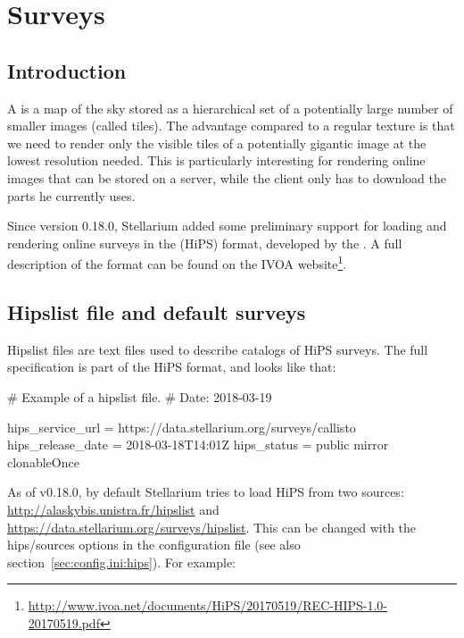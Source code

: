 
\chapter{Surveys}
\label{ch:surveys}

\section{Introduction}
\label{sec:surveys:introduction}


A   is a map of the sky stored as a hierarchical set of a potentially
large number of smaller images (called tiles).  The advantage compared to a
regular texture is that we need to render only the visible tiles of a potentially gigantic image at the
lowest resolution needed.  This is particularly interesting for rendering
online images that can be stored on a server, while the client only has
to download the parts he currently uses.

Since version 0.18.0, Stellarium added some preliminary support for loading and
rendering online surveys in the  (HiPS) format,
developed by the .
A full description of the format can be found on the IVOA website\footnote{%
\url{http://www.ivoa.net/documents/HiPS/20170519/REC-HIPS-1.0-20170519.pdf}}.

\section{Hipslist file and default surveys}
\label{sec:surveys:hipslistFile}

Hipslist files are text files used to describe catalogs of HiPS surveys.  The
full specification is part of the HiPS format, and looks like that:

\begin{configfileScr}
# Example of a hipslist file.
# Date: 2018-03-19

hips_service_url  = https://data.stellarium.org/surveys/callisto
hips_release_date = 2018-03-18T14:01Z
hips_status       = public mirror clonableOnce
\end{configfileScr}

As of v0.18.0, by default Stellarium tries to load HiPS from two sources:
\url{http://alaskybis.unistra.fr/hipslist} and
\url{https://data.stellarium.org/surveys/hipslist}.
This can be changed with the hips/sources options in the configuration
file (see also section~\ref{sec:config.ini:hips}).  For example:

